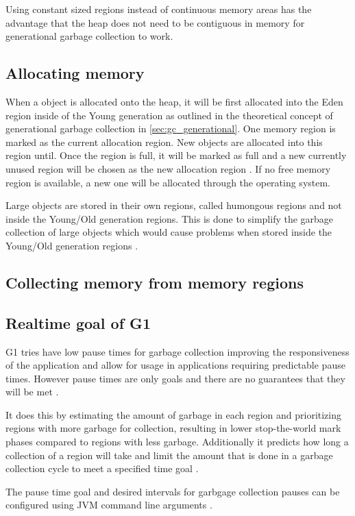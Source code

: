 Using constant sized regions instead of continuous memory areas has the advantage
that the heap does not need to be contiguous in memory for generational garbage collection to work.

\subsection{Allocating memory}

When a object is allocated onto the heap, it will be first allocated into the
Eden region inside of the Young generation as outlined in the theoretical concept
of generational garbage collection in \autoref{sec:gc_generational}.
One memory region is marked as the current allocation region.
New objects are allocated into this region until.
Once the region is full, it will be marked as full and a new currently unused region will be
chosen as the new allocation region \cite[2.1 Allocation]{java_g1_2004}.
If no free memory region is available, a new one will be allocated through the operating system.

Large objects are stored in their own regions, called humongous regions
and not inside the Young/Old generation regions.
This is done to simplify the garbage collection of large objects which
would cause problems when stored inside the Young/Old generation regions \cite[2.1 Heap Layout]{java_g1_2004}.

\subsection{Collecting memory from memory regions}


\subsection{Realtime goal of G1}

G1 tries have low pause times for garbage collection improving the
responsiveness of the application and allow for usage in applications
requiring predictable pause times. However pause times are only goals
and there are no guarantees that they will be met
\cite[3.2 Satisfying a Soft Real-Time Goal]{java_g1_2004}.

It does this by estimating the amount of garbage in each region and
prioritizing regions with more garbage for collection, resulting in lower stop-the-world mark phases
compared to regions with less garbage. %
Additionally it predicts how long a collection of a region will take and
limit the amount that is done in a garbage collection cycle to meet a
specified time goal \cite[3.2.1 Predicting Evacuation Pause Times]{java_g1_2004}.

The pause time goal and desired intervals for garbgage collection pauses can be configured using
JVM command line arguments \cite[Ergonomic Defaults for G1 GC]{java_g1_getting_started}.

